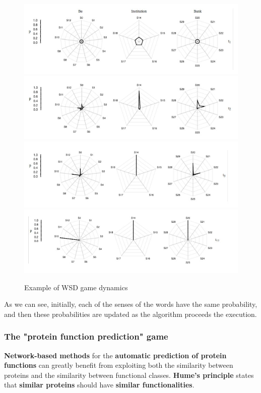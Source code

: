 \begin{figure}[h!]
    \centering
    \includegraphics[scale = 1.4]{img/camc6.jpg}
    \includegraphics[scale = 1.4]{img/camc7.jpg}
    \includegraphics[scale = 1.4]{img/camc8.jpg}
    \includegraphics[scale = 1.4]{img/camc9.jpg}
    \label{camc6_9}
    \caption{Example of WSD game dynamics}
\end{figure}

As we can see, initially, each of the senses of the words have the same probability, and then these probabilities are updated as the algorithm proceeds the execution. 

\subsubsection{The "protein function prediction" game}
\textbf{Network-based methods} for the \textbf{automatic prediction of protein functions} can greatly benefit from exploiting both the similarity between proteins and the similarity between functional classes. \textbf{Hume’s principle} states that \textbf{similar proteins} should have \textbf{similar functionalities}.

